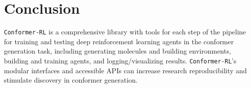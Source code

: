 \documentclass[twoside,11pt]{article}
\newcommand{\code}[1]{\texttt{#1}}
\newcommand{\titleofpaper}{Conformer-RL}
\begin{document}
\section{Conclusion}
\code{\titleofpaper} is a comprehensive library with tools for each step of the pipeline for training and testing deep reinforcement learning agents in the conformer generation task, including generating molecules and building environments, building and training agents, and logging/visualizing results. \code{\titleofpaper}'s modular interfaces and accessible APIs can increase research reproducibility and stimulate discovery in conformer generation.



\newpage


\vskip 0.2in




\newpage

\end{document}
